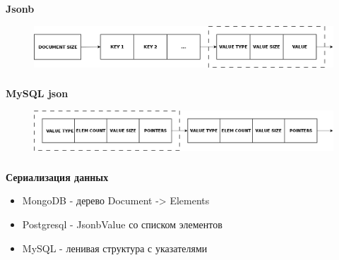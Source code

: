 \documentclass[18pt, compress, aspectratio=169]{beamer}
\begin{document}
\begin{frame}
    \frametitle{}
    \begin{center}
    \textbf{Jsonb}
    \begin{figure}
        \includegraphics[width=1.0\textwidth,center]{jsonb.png}
    \end{figure}
    \end{center}
\end{frame}


\begin{frame}
    \frametitle{}
    \begin{center}
    \textbf{MySQL json}
    \begin{figure}
        \includegraphics[width=1.0\textwidth,center]{mysql_json.png}
    \end{figure}
    \end{center}
\end{frame}

\begin{frame}
    \frametitle{}
    \textbf{Сериализация данных}
    \begin{center}
        \begin{itemize}[label={\MVRightarrow}]
            \item MongoDB - дерево Document -> Elements
            \item Postgresql - JsonbValue со списком элементов
            \item MySQL - ленивая структура с указателями
        \end{itemize}
    \end{center}
\end{frame}
\end{document}

